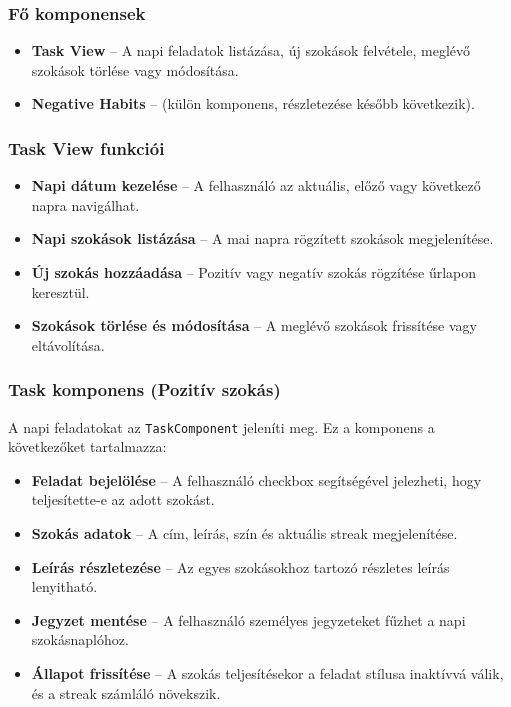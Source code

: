 \documentclass[12pt]{report}
\begin{document}
\subsubsection{Fő komponensek}

\begin{itemize}
  \item \textbf{Task View} -- A napi feladatok listázása, új szokások felvétele, meglévő szokások törlése vagy módosítása.
  \item \textbf{Negative Habits} -- (külön komponens, részletezése később következik).
\end{itemize}

\subsubsection{Task View funkciói}

\begin{itemize}
  \item \textbf{Napi dátum kezelése} -- A felhasználó az aktuális, előző vagy következő napra navigálhat.
  \item \textbf{Napi szokások listázása} -- A mai napra rögzített szokások megjelenítése.
  \item \textbf{Új szokás hozzáadása} -- Pozitív vagy negatív szokás rögzítése űrlapon keresztül.
  \item \textbf{Szokások törlése és módosítása} -- A meglévő szokások frissítése vagy eltávolítása.
\end{itemize}

\subsubsection{Task komponens (Pozitív szokás)}

A napi feladatokat az \texttt{TaskComponent} jeleníti meg. Ez a komponens a következőket tartalmazza:

\begin{itemize}
  \item \textbf{Feladat bejelölése} -- A felhasználó checkbox segítségével jelezheti, hogy teljesítette-e az adott szokást.
  \item \textbf{Szokás adatok} -- A cím, leírás, szín és aktuális streak megjelenítése.
  \item \textbf{Leírás részletezése} -- Az egyes szokásokhoz tartozó részletes leírás lenyitható.
  \item \textbf{Jegyzet mentése} -- A felhasználó személyes jegyzeteket fűzhet a napi szokásnaplóhoz.
  \item \textbf{Állapot frissítése} -- A szokás teljesítésekor a feladat stílusa inaktívvá válik, és a streak számláló növekszik.
\end{itemize}
\end{document}
